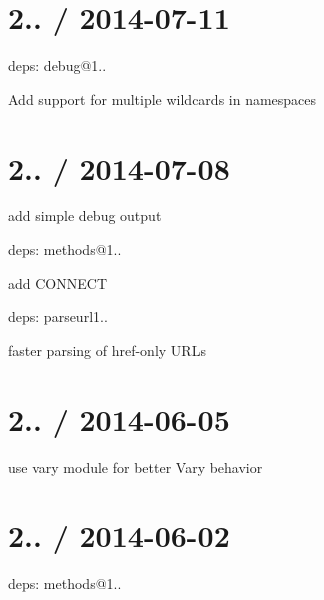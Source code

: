 \section*{2.. / 2014-\/07-\/11 }


\begin{DoxyItemize}
\item deps\+: debug@1..
\begin{DoxyItemize}
\item Add support for multiple wildcards in namespaces
\end{DoxyItemize}
\end{DoxyItemize}

\section*{2.. / 2014-\/07-\/08 }


\begin{DoxyItemize}
\item add simple debug output
\item deps\+: methods@1..
\begin{DoxyItemize}
\item add {\ttfamily C\+O\+N\+N\+E\+CT}
\end{DoxyItemize}
\item deps\+: parseurl1..
\begin{DoxyItemize}
\item faster parsing of href-\/only U\+R\+Ls
\end{DoxyItemize}
\end{DoxyItemize}

\section*{2.. / 2014-\/06-\/05 }


\begin{DoxyItemize}
\item use vary module for better {\ttfamily Vary} behavior
\end{DoxyItemize}

\section*{2.. / 2014-\/06-\/02 }


\begin{DoxyItemize}
\item deps\+: methods@1..
\end{DoxyItemize}

